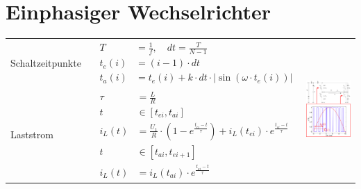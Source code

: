 
\section{Einphasiger Wechselrichter}
    \begin{tabu}{|l|l|p{0.3\textwidth}}
        Schaltzeitpunkte 
        &\ $\begin{aligned}
        T &= \frac{1}{f}, \quad dt = \frac{T}{N-1}\\
        t_e(i) &= (i-1) \cdot dt\\
        t_a(i) &= t_e(i) + k \cdot dt \cdot |\sin(\omega \cdot t_e(i))|
        \end{aligned}$ 
        & \\
        Laststrom 
        &\ $\begin{aligned}
        \tau &= \frac{L}{R}\\
        t &\in [t_{ei},t_{ai}]\\
        i_L(t) &= \frac{U_1}{R} \cdot \left( 1-e^{\frac{t_{ei}-t}{\tau}}\right) + i_L(t_{ei}) \cdot e^{\frac{t_{ei}-t}{\tau}}\\
        t &\in [t_{ai},t_{ei+1}]\\
        i_L(t) &= i_L(t_{ai}) \cdot e^{\frac{t_{ai}-t}{\tau}}
        \end{aligned}$ &\\
    \end{tabu}
    \\\\